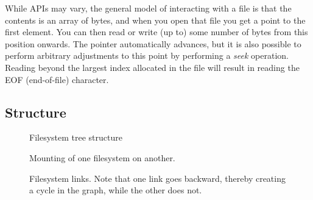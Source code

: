 While APIs may vary, the general model of interacting with a file is that the contents is an array of bytes, and when you open that file you get a point to the first element. You can then read or write (up to) some number of bytes from this position onwards. The pointer automatically advances, but it is also possible to perform arbitrary adjustments to this point by performing a \textsl{seek} operation. Reading beyond the largest index allocated in the file will result in reading the EOF (end-of-file) character.


\subsection{Structure}


\begin{figure}[tbp]
  \begin{center}
  \end{center}
  \caption{Filesystem tree structure}
  \label{fig:topics:fs:dir}
\end{figure}


\begin{figure}[tbp]
  \begin{center}
  \end{center}
  \caption{Mounting of one filesystem on another.}
  \label{fig:topics:fs:mount}
\end{figure}


\begin{figure}[tbp]
  \begin{center}
  \end{center}
  \caption[Filesystem links]{Filesystem links. Note that one link goes backward, thereby creating a cycle in the graph, while the other does not.}
  \label{fig:topics:fs:links}
\end{figure}

